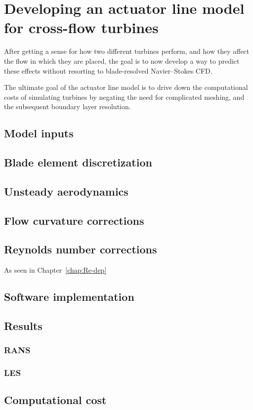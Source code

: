 \chapter{Developing an actuator line model for cross-flow turbines}

After getting a sense for how two different turbines perform, and how they
affect the flow in which they are placed, the goal is to now develop a way to
predict these effects without resorting to blade-resolved Navier--Stokes CFD.

The ultimate goal of the actuator line model is to drive down the computational
costs of simulating turbines by negating the need for complicated meshing, and
the subsequent boundary layer resolution.

\section{Model inputs}


\section{Blade element discretization}

\section{Unsteady aerodynamics}

\section{Flow curvature corrections}

\section{Reynolds number corrections}
As seen in Chapter~\ref{chap:Re-dep}

\section{Software implementation}

\section{Results}

\subsection{RANS}

\subsection{LES}

\section{Computational cost}
